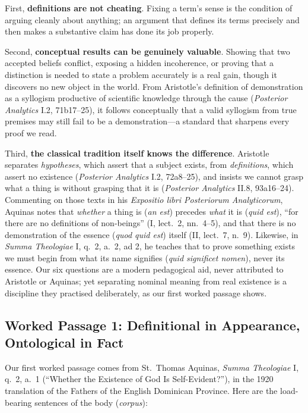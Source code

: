 First, \textbf{definitions are not cheating}. Fixing a term's sense is the condition of arguing cleanly about anything; an argument that defines its terms precisely and then makes a substantive claim has done its job properly.

Second, \textbf{conceptual results can be genuinely valuable}. Showing that two accepted beliefs conflict, exposing a hidden incoherence, or proving that a distinction is needed to state a problem accurately is a real gain, though it discovers no new object in the world. From Aristotle's definition of demonstration as a syllogism productive of scientific knowledge through the cause (\emph{Posterior Analytics} I.2, 71b17--25), it follows conceptually that a valid syllogism from true premises may still fail to be a demonstration---a standard that sharpens every proof we read.

Third, \textbf{the classical tradition itself knows the difference}. Aristotle separates \emph{hypotheses}, which assert that a subject exists, from \emph{definitions}, which assert no existence (\emph{Posterior Analytics} I.2, 72a8--25), and insists we cannot grasp what a thing is without grasping that it is (\emph{Posterior Analytics} II.8, 93a16--24). Commenting on those texts in his \emph{Expositio libri Posteriorum Analyticorum}, Aquinas notes that \emph{whether} a thing is (\emph{an est}) precedes \emph{what} it is (\emph{quid est}), ``for there are no definitions of non-beings'' (I, lect.\ 2, nn.\ 4--5), and that there is no demonstration of the essence (\emph{quod quid est}) itself (II, lect.\ 7, n.\ 9). Likewise, in \emph{Summa Theologiae} I, q.\ 2, a.\ 2, ad 2, he teaches that to prove something exists we must begin from what its name signifies (\emph{quid significet nomen}), never its essence. Our six questions are a modern pedagogical aid, never attributed to Aristotle or Aquinas; yet separating nominal meaning from real existence is a discipline they practised deliberately, as our first worked passage shows.

\subsection{Worked Passage 1: Definitional in Appearance, Ontological in Fact}

Our first worked passage comes from St.\ Thomas Aquinas, \emph{Summa Theologiae} I, q.\ 2, a.\ 1 (``Whether the Existence of God Is Self-Evident?''), in the 1920 translation of the Fathers of the English Dominican Province. Here are the load-bearing sentences of the body (\emph{corpus}):

